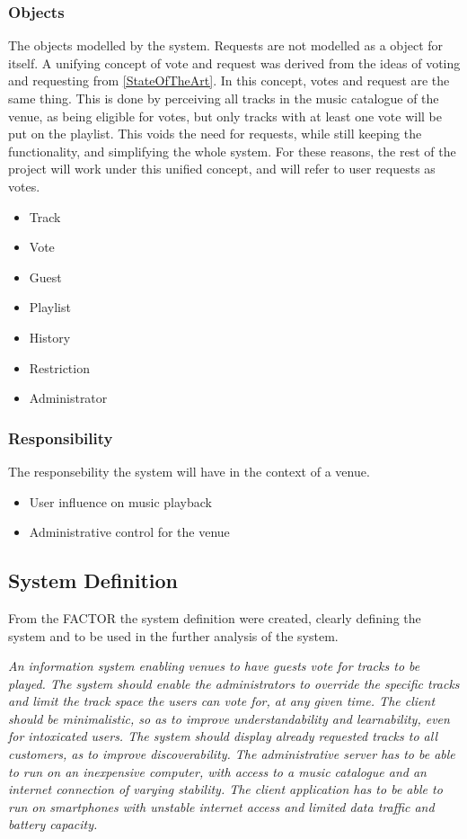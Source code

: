 \subsubsection{Objects}
The objects modelled by the system.
Requests are not modelled as a object for itself. A unifying concept of vote and request was derived from the ideas of voting and requesting from \cref{StateOfTheArt}. In this concept, votes and request are the same thing. This is done by perceiving all tracks in the music catalogue of the venue, as being eligible for votes, but only tracks with at least one vote will be put on the playlist. This voids the need for requests, while still keeping the functionality, and simplifying the whole system. For these reasons, the rest of the project will work under this unified concept, and will refer to user requests as votes.
\begin{itemize}
    \item Track
    \item Vote
    \item Guest
    \item Playlist
		\item History
    \item Restriction
    \item Administrator
\end{itemize}

\subsubsection{Responsibility}
The responsebility the system will have in the context of a venue.
\begin{itemize}
    \item User influence on music playback
    \item Administrative control for the venue
\end{itemize}

\subsection{System Definition}
From the FACTOR the system definition were created, clearly defining the system and to be used in the further analysis of the system.

\begin{center}
\textit{An information system enabling venues to have guests vote for tracks to be played. The system should enable the administrators to override the specific tracks and limit the track space the users can vote for, at any given time. The client should be minimalistic, so as to improve understandability and learnability, even for intoxicated users. The system should display already requested tracks to all customers, as to improve discoverability.
The administrative server has to be able to run on an inexpensive computer, with access to a music catalogue and an internet connection of varying stability. The client application has to be able to run on smartphones with unstable internet access and limited data traffic and battery capacity.}
\end{center}